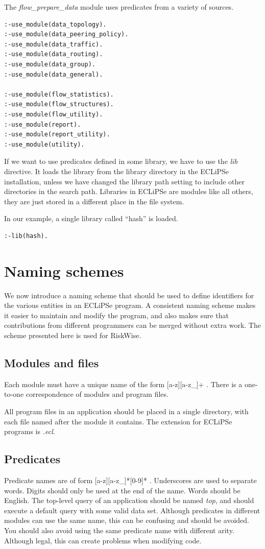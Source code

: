\documentclass[a4paper,12pt]{report}
\begin{document}
The {\it flow\_prepare\_data} module uses predicates from a variety of sources.
\begin{verbatim}
:-use_module(data_topology).
:-use_module(data_peering_policy).
:-use_module(data_traffic).
:-use_module(data_routing).
:-use_module(data_group).
:-use_module(data_general).

:-use_module(flow_statistics).
:-use_module(flow_structures).
:-use_module(flow_utility).
:-use_module(report).
:-use_module(report_utility).
:-use_module(utility).
\end{verbatim}

If we want to use predicates defined in some library, we have to use the {\it lib} directive. It loads the library from the library directory in the ECLiPSe installation, unless we have changed the library path setting to include other directories in the search path.
Libraries in ECLiPSe are modules like all others, they are just stored in a different place in the file system.

In our example, a single library called ``hash'' is loaded.
\begin{verbatim}
:-lib(hash).
\end{verbatim}

\section{Naming schemes}
We now introduce a naming scheme that should be used to define identifiers for the various entities in an ECLiPSe program. A consistent naming scheme makes it easier to maintain and modify the program, and also makes sure that contributions from different programmers can be merged without extra work. The scheme presented here is used for RiskWise.

\subsection{Modules and files}
Each module must have a unique name of the form [a-z][a-z\_]+ . There is a one-to-one correspondence of modules and program files.

All program files in an application should be placed in a single directory, with each file named after the module it contains. The extension for ECLiPSe programs is {\it .ecl}.

\subsection{Predicates}
Predicate names are of form [a-z][a-z\_]*[0-9]* . Underscores are used to separate words. Digits should only be used at the end of the name. Words should be English. The top-level query of an application should be named {\it top}, and should execute a default query with some valid data set. Although predicates in different modules can use the same name, this can be confusing and should be avoided. You should also avoid using the same predicate name with different arity. Although legal, this can create problems when modifying code.
\end{document}
